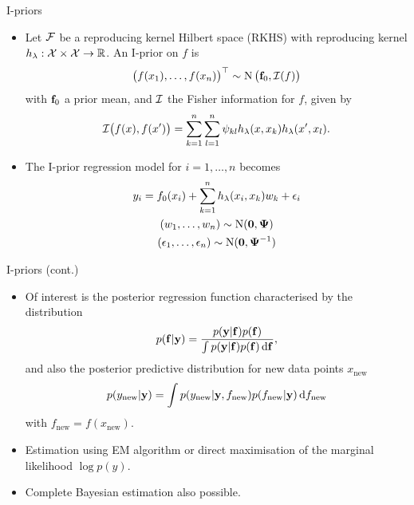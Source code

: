 \begin{frame}{I-priors}
  \vspace{-16pt}
  \begin{itemize}\setlength\itemsep{1em}
    \item Let ${\mathcal F}$ be a reproducing kernel Hilbert space (RKHS) with reproducing kernel $h_\lambda: {\mathcal X} \times {\mathcal X} \rightarrow \mathbb{R}$. An I-prior on $f$ is
    \[
      \big(f(x_1), \dots, f(x_n)\big)^\top \sim \operatorname{N}\big({\mathbf f}_0, {\mathcal I}(f)\big)
    \] 
    with ${\mathbf f}_0$ a prior mean, and ${\mathcal I}$ the Fisher information for $f$, given by
    \[
      {\mathcal I}\big(f(x), f(x')\big) = \sum_{k=1}^n\sum_{l=1}^n \psi_{kl} h_\lambda(x,x_k) h_\lambda(x',x_l).
    \]
    \item The I-prior regression model for $i = 1,\dots,n$ becomes
    \begin{align*}
      \begin{gathered}
        y_i = f_0(x_i) + \sum_{k=1}^n h_\lambda(x_i, x_k)w_k + \epsilon_i \\
        (w_1, \dots, w_n) \sim \operatorname{N}({\mathbf 0}, {\bm\Psi}) \\
        (\epsilon_1, \dots, \epsilon_n) \sim \operatorname{N}({\mathbf 0}, {\bm\Psi}^{-1})
      \end{gathered}    
    \end{align*}
  \end{itemize}
\end{frame}

\begin{frame}{I-priors (cont.)}
  \vspace{-5pt}
  \begin{itemize}\setlength\itemsep{0.8em}
    \item Of interest is the posterior regression function characterised by the distribution
    \[
      p({\mathbf f} | {\mathbf y} ) = \frac{p({\mathbf y} | {\mathbf f}) p({\mathbf f})}{\int p({\mathbf y} | {\mathbf f}) p({\mathbf f}) \, \text{d}{\mathbf f}},
    \]
    and also the posterior predictive distribution for new data points $x_{\text{new}}$
    \[
      p(y_{\text{new}} | {\mathbf y}) = \int p(y_{\text{new}} | {\mathbf y}, f_{\text{new}}) p(f_{\text{new}} | {\mathbf y} ) \, \text{d} f_{\text{new}}
    \]
    with $f_{\text{new}} = f(x_{\text{new}})$.
    \item Estimation using EM algorithm or direct maximisation of the marginal likelihood $\log p(y)$.
    \item Complete Bayesian estimation also possible.
  \end{itemize}
  \vspace{5pt}
\end{frame}

